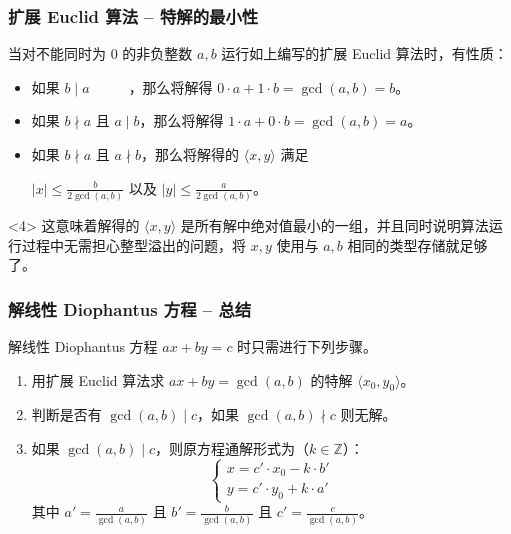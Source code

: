 \documentclass{../pkslide}
\begin{document}
\begin{frame}
  \frametitle{扩展 Euclid 算法 -- 特解的最小性}
  当对不能同时为 $0$ 的非负整数 $a, b$ 运行如上编写的扩展 Euclid 算法时，有性质：
  
  \begin{itemize}
    \item<2-> 如果 $b \mid a$\ \hspace{1em}\ $\phantom{a \mid b}$，那么将解得 $0 \cdot a + 1 \cdot b = \gcd(a, b) = b$。
    \item<2-> 如果 $b \nmid a$ 且 $a \mid b$，那么将解得 $1 \cdot a + 0 \cdot b = \gcd(a, b) = a$。
    \item<3-> 如果 $b \nmid a$ 且 $a \nmid b$，那么将解得的 $\langle x, y \rangle$ 满足%
      \begin{center}
        $|x| \le \frac{b}{2 \gcd(a, b)}$ 以及 $|y| \le \frac{a}{2 \gcd(a, b)}$。
      \end{center}
  \end{itemize}
  
  \begin{uncoverenv}<4>
    这意味着解得的 $\langle x, y \rangle$ 是所有解中绝对值最小的一组，并且同时说明算法运行过程中无需担心整型溢出的问题，将 $x, y$ 使用与 $a, b$ 相同的类型存储就足够了。
  \end{uncoverenv}
\end{frame}

\begin{frame}
  \frametitle{解线性 Diophantus 方程 -- 总结}
  解线性 Diophantus 方程 $a x + b y = c$ 时只需进行下列步骤。
  
  \begin{enumerate}
    \item<2-> 用扩展 Euclid 算法求 $a x + b y = \gcd(a, b)$ 的特解 $\langle x_0, y_0 \rangle$。
    \item<3-> 判断是否有 $\gcd(a, b) \mid c$，如果 $\gcd(a, b) \nmid c$ 则无解。
    \item<4> 如果 $\gcd(a, b) \mid c$，则原方程通解形式为（$k \in \mathbb Z$）：%
      \[
        \left\{ \begin{aligned}
          x = c' \cdot x_0 - k \cdot b' \\
          y = c' \cdot y_0 + k \cdot a'
        \end{aligned} \right.
      \]%
      其中 $a' = \frac{a}{\gcd(a, b)}$ 且 $b' = \frac{b}{\gcd(a, b)}$ 且 $c' = \frac{c}{\gcd(a, b)}$。
  \end{enumerate}
\end{frame}
\end{document}
